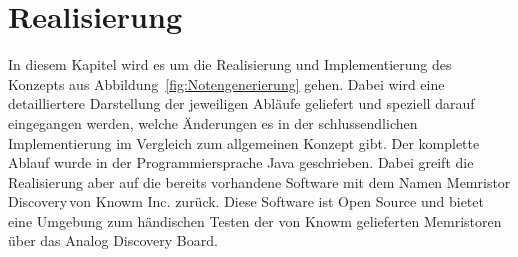 

\chapter{Realisierung}
\label{sec:Chapter4}
In diesem Kapitel wird es um die Realisierung und Implementierung des Konzepts aus Abbildung~\ref{fig:Notengenerierung} gehen. Dabei wird eine detailliertere Darstellung der jeweiligen Abläufe geliefert und speziell darauf eingegangen werden, welche Änderungen es in der schlussendlichen Implementierung im Vergleich zum allgemeinen Konzept gibt. Der komplette Ablauf wurde in der Programmiersprache Java geschrieben. Dabei greift die Realisierung aber auf die bereits vorhandene Software mit dem Namen \glqq Memristor Discovery\grqq\,von Knowm Inc. zurück. Diese Software ist Open Source und bietet eine Umgebung zum händischen Testen der von Knowm gelieferten Memristoren über das Analog Discovery Board.

